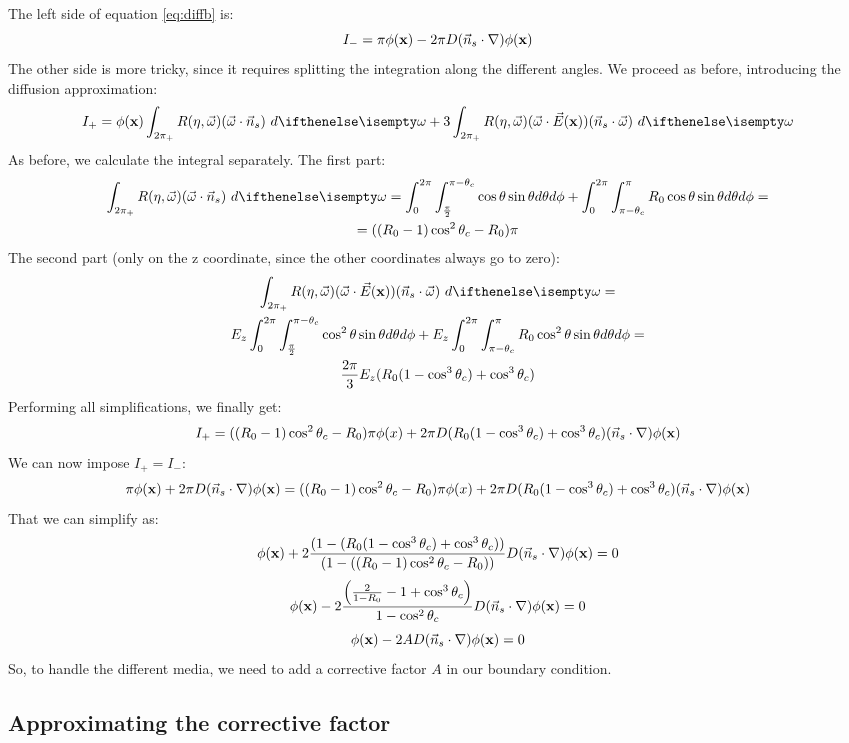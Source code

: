 \documentclass[10pt,a4paper]{article}
\begin{document}
The left side of equation \ref{eq:diffb} is:
$$
I_- = \pi {\phi}(\mathbf{x}) - 2 \pi D (\vec{n}_s \cdot {\nabla}) {\phi}(\mathbf{x})
$$
The other side is more tricky, since it requires splitting the integration along the different angles. We proceed as before, introducing the diffusion approximation:
$$
I_+ = \xfunc{\phi} \hemisphere{ R(\eta, \omegavec) (\omegavec \cdot \vec{n}_s)}{} + 3  \hemisphere{R(\eta, \omegavec)(\omegavec \cdot \xvecfunc{E}) (\vec{n}_s \cdot \omegavec) }{}
$$
As before, we calculate the integral separately. The first part:
\begin{multline*}
\hemisphere{ R(\eta, \omegavec) (\omegavec \cdot \vec{n}_s)}{} = \int_{0}^{2\pi} \int_{\frac{\pi}{2}}^{\pi- \theta_c} \cos\theta \sin\theta d\theta d\phi + \int_{0}^{2\pi} \int_{\pi - \theta_c}^{\pi} R_0 \cos\theta \sin\theta d\theta d\phi = \\ = ((R_0-1)\cos^2\theta_c-R_0)\pi
\end{multline*}
The second part (only on the z coordinate, since the other coordinates always go to zero):
\begin{multline*}
\hemisphere{R(\eta, \omegavec)(\omegavec \cdot \xvecfunc{E}) (\vec{n}_s \cdot \omegavec) }{} = \\E_z \int_{0}^{2\pi}  \int_{\frac{\pi}{2}}^{\pi- \theta_c} \cos^2\theta \sin\theta d\theta d\phi + E_z \int_{0}^{2\pi} \int_{\pi - \theta_c}^{\pi} R_0 \cos^2\theta \sin\theta d\theta d\phi = \\
\frac{2\pi}{3} E_z (R_0(1-\cos^3 \theta_c)+\cos^3 \theta_c)
\end{multline*}
Performing all simplifications, we finally get:
$$
I_+ =  ((R_0-1)\cos^2\theta_c-R_0)\pi \phi(x) + 2 \pi D (R_0(1-\cos^3 \theta_c)+\cos^3 \theta_c) (\vec{n}_s \cdot {\nabla}) {\phi}(\mathbf{x})
$$
We can now impose $I_+ = I_-$:
$$
 \pi {\phi}(\mathbf{x}) + 2 \pi D (\vec{n}_s \cdot {\nabla}) {\phi}(\mathbf{x}) = ((R_0-1)\cos^2\theta_c-R_0)\pi \phi(x) + 2 \pi D (R_0(1-\cos^3 \theta_c)+\cos^3 \theta_c) (\vec{n}_s \cdot {\nabla}) {\phi}(\mathbf{x})
$$
That we can simplify as:
$$
  {\phi}(\mathbf{x}) + 2 \frac{(1 - (R_0(1-\cos^3 \theta_c)+\cos^3 \theta_c))}{(1 - ((R_0-1)\cos^2\theta_c-R_0))} D (\vec{n}_s \cdot {\nabla}) {\phi}(\mathbf{x}) = 0
$$
$$
  {\phi}(\mathbf{x}) - 2 \frac{\left(\frac{2}{1-R_0} - 1 + \cos^3 \theta_c\right)}{1 - \cos^2\theta_c} D (\vec{n}_s \cdot {\nabla}) {\phi}(\mathbf{x}) = 0
$$
$$
  {\phi}(\mathbf{x}) - 2 A D (\vec{n}_s \cdot {\nabla}) {\phi}(\mathbf{x}) = 0
$$
So, to handle the different media, we need to add a corrective factor $A$ in our boundary condition.

\subsection{Approximating the corrective factor}
\end{document}
